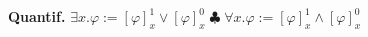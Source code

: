 \documentclass{article}
\newcommand{\Kb}{\pazocal{K}}
\newcommand{\Ib}{\pazocal{I}}
\newcommand{\Sb}{\pazocal{S}}
\newcommand{\Rb}{\pazocal{R}}
\newcommand{\Lb}{\pazocal{L}}
\newcommand{\Bb}{\pazocal{B}}
\newcommand{\Vb}{\pazocal{V}}
\begin{document}
\begin{multicols}{4}





\textbf{Quantif.} ${\exists x.\varphi:=[\varphi]^{1}_{x} \vee [\varphi]^{0}_{x}}\; \clubsuit\; {\forall x.\varphi:=[\varphi]^{1}_{x} \wedge [\varphi]^{0}_{x}}$


\end{multicols}
\end{document}
